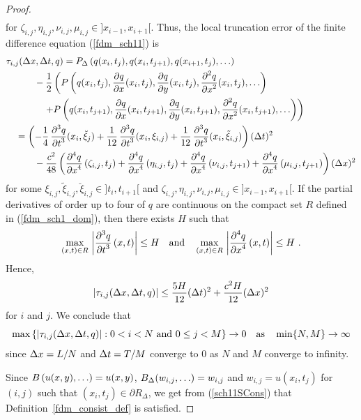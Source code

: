 \begin{proof}
\begin{align*}
\end{align*}
for $\zeta_{i,j}, \eta_{i,j},\nu_{i,j},\mu_{i,j} \in ]x_{i-1},x_{i+1}[$.
Thus, the local truncation error of the finite difference equation
(\ref{fdm_sch11}) is
\begin{align*}
&\tau_{i,j}(\Delta{x},\Delta{t},q)
= P_\Delta\left(q(x_i,t_j), q(x_i,t_{j+1}), q(x_{i+1},t_j), \ldots\right) \\
&\quad \qquad -
\frac{1}{2} \left(
P\left(q(x_i,t_j), \frac{\partial{q}}{\partial{x}}(x_i,t_j), \frac{\partial{q}}{\partial{y}}(x_i,t_j),
\frac{\displaystyle \partial^{2}{q}} {\displaystyle \partial{x}^{2}}(x_i,t_j), \ldots \right) \right. \\
&\qquad \qquad \left. + P\left(q(x_i,t_{j+1}), \frac{\partial{q}}{\partial{x}}(x_i,t_{j+1}),
\frac{\partial{q}}{\partial{y}}(x_i,t_{j+1}), \frac{\displaystyle \partial^{2}{q}} {\displaystyle \partial{x}^{2}}(x_i,t_{j+1}), \ldots \right)
\right) \\
&\quad = \left( -\frac{1}{4}\, \frac{\displaystyle \partial^{3}{q}} {\displaystyle \partial{t}^{3}}(x_i,\breve{\xi}_j)
+ \frac{1}{12}\, \frac{\displaystyle \partial^{3}{q}} {\displaystyle \partial{t}^{3}}(x_i,\xi_{i,j})
+ \frac{1}{12}\, \frac{\displaystyle \partial^{3}{q}} {\displaystyle \partial{t}^{3}}(x_i,\tilde{\xi}_{i,j}) \right) (\Delta{t})^2 \\
&\quad \qquad
- \frac{c^2}{48} \left( \frac{\displaystyle \partial^{4}{q}} {\displaystyle \partial{x}^{4}}\left(\zeta_{i,j},t_j\right)
+ \frac{\displaystyle \partial^{4}{q}} {\displaystyle \partial{x}^{4}}\left(\eta_{i,j},t_j\right)
+ \frac{\displaystyle \partial^{4}{q}} {\displaystyle \partial{x}^{4}}\left(\nu_{i,j},t_{j+1}\right)
+ \frac{\displaystyle \partial^{4}{q}} {\displaystyle \partial{x}^{4}}\left(\mu_{i,j},t_{j+1}\right)\right) (\Delta{x})^2
\end{align*}
for some $\xi_{i,j}, \tilde{\xi}_{i,j},\breve{\xi}_{i,j} \in ]t_i,t_{i+1}[$ and
$\zeta_{i,j}, \eta_{i,j},\nu_{i,j},\mu_{i,j} \in ]x_{i-1},x_{i+1}[$.
If the partial derivatives of order up to four of $q$ are continuous on the
compact set $R$ defined in (\ref{fdm_sch1_dom}), then
there exists $H$ such that
\[
\max_{(x,t)\in R}\, \left|\frac{\displaystyle \partial^{3}{q}} {\displaystyle \partial{t}^{3}}\left(x,t\right) \right| \leq H
\quad \text{and} \quad
\max_{(x,t)\in R}\, \left|\frac{\displaystyle \partial^{4}{q}} {\displaystyle \partial{x}^{4}}\left(x,t\right) \right| \leq H \ .
\]
Hence,
\begin{equation} \label{fdm_sch11STrunc}
\left| \tau_{i,j}(\Delta{x},\Delta{t},q) \right | \leq
\frac{5H}{12} (\Delta{t})^2 + \frac{c^2 H}{12} (\Delta{x})^2
\end{equation}
for $i$ and $j$.  We conclude that
\begin{equation} \label{sch11SCons}
\max \left\{ \left|\tau_{i,j}(\Delta{x},\Delta{t},q)\right| :
0<i<N \ \text{and} \ 0\leq j < M
\right\} \rightarrow 0 \quad \text{as} \quad \min \{N, M\} \rightarrow \infty
\end{equation}
since $\Delta{x} = L/N$ and $\Delta{t} = T/M$ converge to $0$ as $N$ and
$M$ converge to infinity.

Since $\displaystyle B\left(u(x,y), \ldots \right) = u(x,y)$,
$\displaystyle B_\Delta(w_{i,j},\ldots) = w_{i,j}$ and $w_{i,j} = u(x_i,t_j)$
for $(i,j)$ such that $(x_i,t_j) \in \partial R_\Delta$, we get from 
(\ref{sch11SCons}) that Definition~\ref{fdm_consist_def} is satisfied.
\end{proof}

